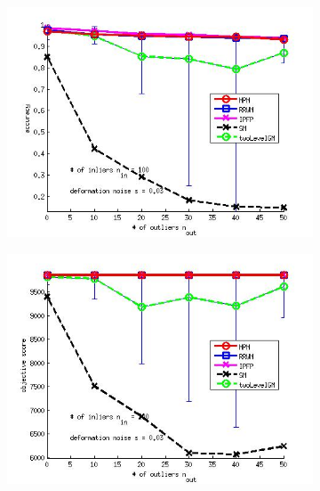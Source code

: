 \documentclass[
	fontsize=12pt,
	paper=a4,
	twoside=false,
	numbers=noenddot,
	plainheadsepline,
	toc=listof,
	toc=bibliography
]{scrartcl}
\begin{document}
\begin{figure}[h] 
	\begin{subfigure}[b]{0.3\textwidth}
		\centering
		\includegraphics[scale=0.25]{"fig_ver2608/syntheticPointSets/ver4.3/outliertest_n50/accuracy_avg10t"} 
	\end{subfigure}%
	\begin{subfigure}[b]{0.3\textwidth}
		\centering
		\includegraphics[scale=0.25]{"fig_ver2608/syntheticPointSets/ver4.3/outliertest_n50/score_avg10t"} 
	\end{subfigure} 
	\begin{subfigure}[b]{0.3\textwidth}
		\centering

\end{subfigure}
\end{figure}
\end{document}
